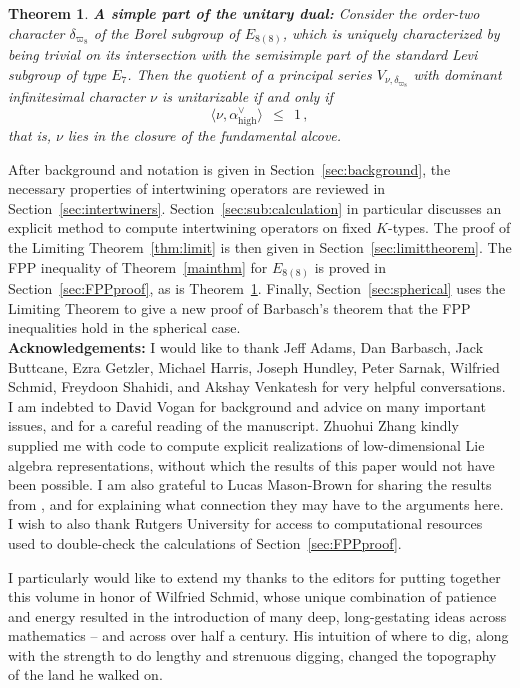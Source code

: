 \documentclass[12pt]{article}
\newtheorem{thm}[equation]{Theorem}
\newcommand{\thmref}[1]{Theorem~\ref{#1}}
\newcommand{\secref}[1]{Section~\ref{#1}}
\numberwithin{equation}{section}
\renewcommand\d{\delta}
\renewcommand\({\left(}
\renewcommand\){\right)}
\begin{document}
\begin{thm}\label{thm:easyalcove}
{\bf A simple part of the unitary dual:}
Consider the  order-two character $\d_{\varpi_8}$ of the Borel subgroup of $E_{8(8)}$, which is uniquely characterized by being trivial on its intersection with the semisimple part of the standard Levi subgroup of type $E_7$. Then the quotient of a principal series $V_{\nu,\d_{\varpi_8}}$ with dominant infinitesimal character $\nu$ is unitarizable if and only if
\begin{equation}\label{fundalcove}
  \langle \nu,\alpha_{\text{high}}^\vee\rangle \ \ \le \ \ 1\,,
\end{equation}
that is, $\nu$ lies in the closure of the fundamental alcove.
\end{thm}


After background and notation is given in \secref{sec:background}, the necessary properties of intertwining operators are reviewed in \secref{sec:intertwiners}.  \secref{sec:sub:calculation} in particular discusses an explicit method to compute intertwining operators on fixed $K$-types.
The proof of the Limiting Theorem~\ref{thm:limit} is then given in \secref{sec:limittheorem}.  The FPP inequality of Theorem~\ref{mainthm} for $E_{8(8)}$ is proved in \secref{sec:FPPproof}, as is \thmref{thm:easyalcove}.  Finally, \secref{sec:spherical} uses the Limiting Theorem to give a new proof of Barbasch's theorem that the FPP inequalities hold in the spherical case.\\

{\bf Acknowledgements:} I would like to thank Jeff Adams, Dan Barbasch, Jack Buttcane,  Ezra Getzler, Michael Harris, Joseph Hundley, Peter Sarnak, Wilfried Schmid,  Freydoon Shahidi, and Akshay Venkatesh for very helpful conversations. I am indebted to David Vogan for background and advice on many important issues, and for a careful reading of the manuscript.  Zhuohui Zhang kindly supplied me with  code \cite{Zhangrepo} to compute explicit realizations of low-dimensional Lie algebra representations, without which the results of this paper would not have been possible.
I am also grateful to Lucas Mason-Brown for sharing the results from \cite{DM-B}, and for explaining what connection they may have to the arguments here.  I wish to also thank Rutgers University for access to computational resources used to double-check the calculations of \secref{sec:FPPproof}.

I particularly would like to extend my thanks to the editors for putting together this volume in honor of Wilfried Schmid, whose unique combination of patience and energy resulted in the introduction of many deep, long-gestating ideas across mathematics -- and across over half a century.  His intuition of where to dig, along with the strength to do lengthy and strenuous digging, changed the topography of the land he walked on.
\end{document}
